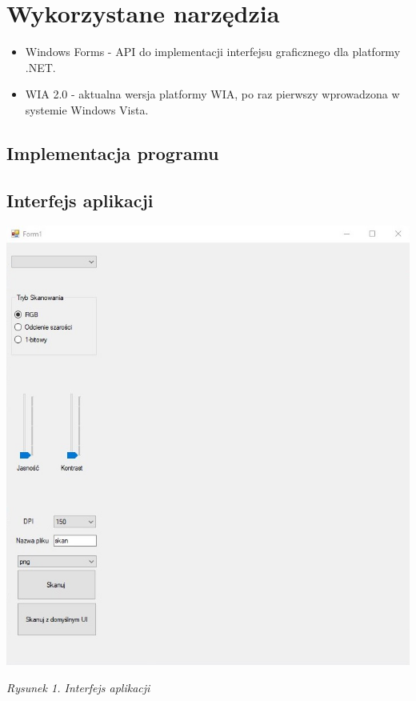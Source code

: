 \documentclass[12pt,a4paper,notitlepage]{report}
\begin{document}
\section{Wykorzystane narzędzia}
\begin{itemize}
\item Windows Forms - API do implementacji interfejsu graficznego dla platformy .NET.
\item WIA 2.0 - aktualna wersja platformy WIA, po raz pierwszy wprowadzona w systemie Windows Vista.
\end{itemize}
\begin{adjustwidth}{0pt}{-50pt}
\section{Implementacja programu}
\subsection{Interfejs aplikacji}
\noindent \includegraphics[scale=0.85]{okno}
\begin{center}
\begin{normalsize}
\textit{Rysunek 1. Interfejs aplikacji}
\end{normalsize}
\end{center}
\newpage

\end{adjustwidth}
\end{document}
